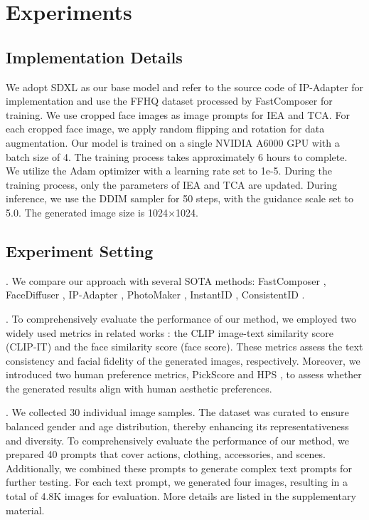 
\section{Experiments}

\subsection{Implementation Details} 
We adopt SDXL as our base model and refer to the source code of IP-Adapter \cite{ye2023ip} for implementation and use the FFHQ dataset processed by FastComposer \cite{xiao2023fastcomposer} for training. We use cropped face images as image prompts for IEA and TCA. For each cropped face image, we apply random flipping and rotation for data augmentation. Our model is trained on a single NVIDIA A6000 GPU with a batch size of 4. The training process takes approximately 6 hours to complete. We utilize the Adam optimizer with a learning rate set to 1e-5. During the training process, only the parameters of IEA and TCA are updated. During inference, we use the DDIM sampler for 50 steps, with the guidance scale set to 5.0. The generated image size is 1024×1024.

\subsection{Experiment Setting}

. We compare our approach with several SOTA methods: FastComposer \cite{xiao2023fastcomposer}, FaceDiffuser \cite{wang2024high}, IP-Adapter \cite{ye2023ip}, PhotoMaker \cite{li2024photomaker}, InstantID \cite{wang2024instantid}, ConsistentID \cite{huang2024consistentid}.




.
To comprehensively evaluate the performance of our method, we employed two widely used metrics in related works \cite {li2024photomaker,wang2024instantid,huang2024consistentid,xiao2023fastcomposer}: the CLIP image-text similarity score (CLIP-IT) and the face similarity score (face score). These metrics assess the text consistency and facial fidelity of the generated images, respectively. Moreover, we introduced two human preference metrics, PickScore \cite{Kirstain2023PickaPicAO} and HPS \cite{wu2023better}, to assess whether the generated results align with human aesthetic preferences.



. We collected 30 individual image samples. The dataset was curated to ensure balanced gender and age distribution, thereby enhancing its representativeness and diversity. To comprehensively evaluate the performance of our method, we prepared 40 prompts that cover actions, clothing, accessories, and scenes. Additionally, we combined these prompts to generate complex text prompts for further testing. For each text prompt, we generated four images, resulting in a total of 4.8K images for evaluation. More details are listed in the  supplementary material.



